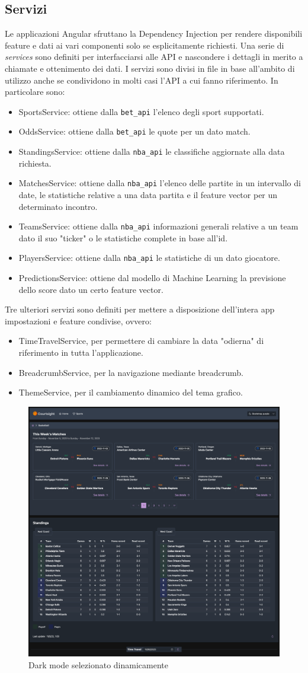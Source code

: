 \subsection{Servizi}
Le applicazioni Angular sfruttano la Dependency Injection per rendere disponibili feature e dati ai vari componenti solo se esplicitamente richiesti. Una serie di \textit{services} sono definiti per interfacciarsi alle API e nascondere i dettagli in merito a chiamate e ottenimento dei dati.
I servizi sono divisi in file in base all'ambito di utilizzo anche se condividono in molti casi l'API a cui fanno riferimento. In particolare sono:
\begin{itemize}
    \item SportsService: ottiene dalla \texttt{bet\_api} l'elenco degli sport supportati.
    \item OddsService: ottiene dalla \texttt{bet\_api} le quote per un dato match.
    \item StandingsService: ottiene dalla \texttt{nba\_api} le classifiche aggiornate alla data richiesta.
    \item MatchesService: ottiene dalla \texttt{nba\_api} l'elenco delle partite in un intervallo di date, le statistiche relative a una data partita e il feature vector per un determinato incontro.
    \item TeamsService: ottiene dalla \texttt{nba\_api} informazioni generali relative a un team dato il suo "ticker" o le statistiche complete in base all'id.
    \item PlayersService: ottiene dalla \texttt{nba\_api} le statistiche di un dato giocatore.
    \item PredictionsService: ottiene dal modello di Machine Learning la previsione dello score dato un certo feature vector.
\end{itemize}
Tre ulteriori servizi sono definiti per mettere a disposizione dell'intera app impostazioni e feature condivise, ovvero:
\begin{itemize}
    \item TimeTravelService, per permettere di cambiare la data "odierna" di riferimento in tutta l'applicazione.
    \item BreadcrumbService, per la navigazione mediante breadcrumb.
    \item ThemeService, per il cambiamento dinamico del tema grafico.
\end{itemize}
\begin{figure}[H]
    \centering
    \includegraphics[width=0.75\linewidth]{img/webapp/themes.png}
    \caption{Dark mode selezionato dinamicamente}
    \label{fig:enter-label}
\end{figure}
\newpage
